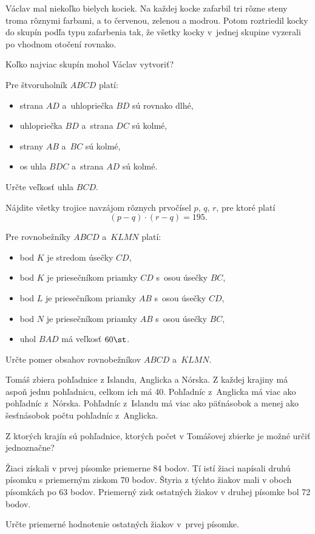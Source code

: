 {%
Václav mal niekoľko bielych kociek.
Na každej kocke zafarbil tri rôzne steny troma rôznymi farbami, a to červenou, zelenou a modrou.
Potom roztriedil kocky do skupín podľa typu zafarbenia tak, že všetky kocky v~jednej skupine vyzerali po vhodnom otočení rovnako.

Koľko najviac skupín mohol Václav vytvoriť?
}

{%
Pre štvoruholník $ABCD$ platí:
\begin{itemize}
  \item strana $AD$ a~uhlopriečka $BD$ sú rovnako dlhé,
  \item uhlopriečka $BD$ a~strana $DC$ sú kolmé,
  \item strany $AB$ a~$BC$ sú kolmé,
  \item os uhla $BDC$ a~strana $AD$ sú kolmé.
\end{itemize}

Určte veľkosť uhla $BCD$.
}

{%
Nájdite všetky trojice navzájom rôznych prvočísel $p$, $q$, $r$, pre ktoré platí
$$
(p-q)\cdot(r-q)=195.
$$
}

{%
Pre rovnobežníky $ABCD$ a~$KLMN$ platí:
\begin{itemize}
  \item bod $K$ je stredom úsečky $CD$,
  \item bod $K$ je priesečníkom priamky $CD$ s~osou úsečky $BC$,
  \item bod $L$ je priesečníkom priamky $AB$ s~osou úsečky $CD$,
  \item bod $N$ je priesečníkom priamky $AB$ s~osou úsečky $BC$,
  \item uhol $BAD$ má veľkosť $60\st$.
\end{itemize}

Určte pomer obsahov rovnobežníkov $ABCD$ a~$KLMN$.
}

{%
Tomáš zbiera pohľadnice z Islandu, Anglicka a Nórska.
Z každej krajiny má aspoň jednu pohľadnicu, celkom ich má 40.
Pohľadníc z~Anglicka má viac ako pohľadníc z~Nórska.
Pohľadníc z~Islandu má viac ako päťnásobok a menej ako šesťnásobok počtu pohľadníc z~Anglicka.

Z ktorých krajín sú pohľadnice, ktorých počet v Tomášovej zbierke je možné určiť jednoznačne?
}

{%
Žiaci získali v prvej písomke priemerne 84 bodov.
Tí istí žiaci napísali druhú písomku s priemerným ziskom 70 bodov.
Štyria z týchto žiakov mali v oboch písomkách po 63 bodov.
Priemerný zisk ostatných žiakov v druhej písomke bol 72 bodov.

Určte priemerné hodnotenie ostatných žiakov v~prvej písomke.
}

